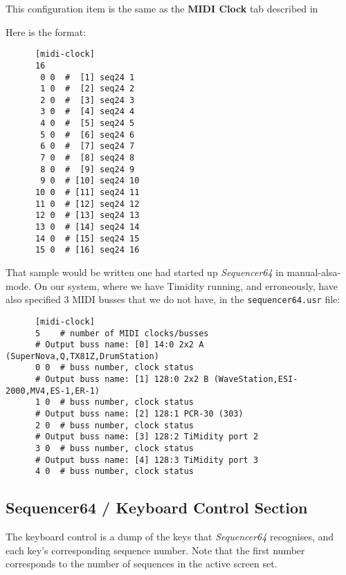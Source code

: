    This configuration item is the same as the 
   \textbf{MIDI Clock} tab described in
   
   Here is the format:

   \begin{verbatim}
      [midi-clock]
      16
       0 0  #  [1] seq24 1
       1 0  #  [2] seq24 2
       2 0  #  [3] seq24 3
       3 0  #  [4] seq24 4
       4 0  #  [5] seq24 5
       5 0  #  [6] seq24 6
       6 0  #  [7] seq24 7
       7 0  #  [8] seq24 8
       8 0  #  [9] seq24 9
       9 0  # [10] seq24 10
      10 0  # [11] seq24 11
      11 0  # [12] seq24 12
      12 0  # [13] seq24 13
      13 0  # [14] seq24 14
      14 0  # [15] seq24 15
      15 0  # [16] seq24 16
   \end{verbatim}

That sample would be written one had started up \textsl{Sequencer64} in
manual-alsa-mode.  On our system, where we have Timidity running, and
erroneously, have also specified 3 MIDI busses that we do not have, in the
\texttt{sequencer64.usr} file:

   \begin{verbatim}
      [midi-clock]
      5    # number of MIDI clocks/busses
      # Output buss name: [0] 14:0 2x2 A (SuperNova,Q,TX81Z,DrumStation)
      0 0  # buss number, clock status
      # Output buss name: [1] 128:0 2x2 B (WaveStation,ESI-2000,MV4,ES-1,ER-1)
      1 0  # buss number, clock status
      # Output buss name: [2] 128:1 PCR-30 (303)
      2 0  # buss number, clock status
      # Output buss name: [3] 128:2 TiMidity port 2
      3 0  # buss number, clock status
      # Output buss name: [4] 128:3 TiMidity port 3
      4 0  # buss number, clock status
   \end{verbatim}

\subsection{Sequencer64 / Keyboard Control Section}
\label{subsec:seq64_rc_file_keyboard_control}
        
   The keyboard control is a dump of the keys that \textsl{Sequencer64}
   recognises, and each key's corresponding sequence number.
   Note that the first number corresponds to the number of sequences in
   the active screen set.

